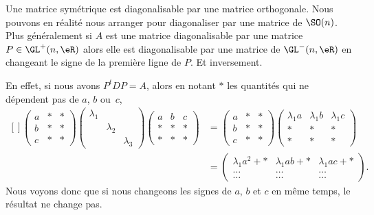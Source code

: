 \begin{remark}  \label{RemGKDZfxu}
    Une matrice symétrique est diagonalisable par une matrice orthogonale. Nous pouvons en réalité nous arranger pour diagonaliser par une matrice de \( \SO(n)\). Plus généralement si \( A\) est une matrice diagonalisable par une matrice \( P\in\GL^+(n,\eR)\) alors elle est diagonalisable par une matrice de \( \GL^-(n,\eR)\) en changeant le signe de la première ligne de \( P\). Et inversement.

    En effet, si nous avons \( P^tDP=A\), alors en notant \( *\) les quantités qui ne dépendent pas de \( a\), \( b\) ou~\( c\),
    \begin{equation}
        \begin{aligned}[]
        \begin{pmatrix}
            a    &   *    &   *    \\
            b    &   *    &   *    \\
            c    &   *    &   *
        \end{pmatrix}
        \begin{pmatrix}
            \lambda_1    &       &       \\
                &   \lambda_2    &       \\
                &       &   \lambda_3
            \end{pmatrix}
            \begin{pmatrix}
                a    &   b    &   c    \\
                *    &   *    &   *    \\
                *    &   *    &   *
            \end{pmatrix}&=
        \begin{pmatrix}
            a    &   *    &   *    \\
            b    &   *    &   *    \\
            c    &   *    &   *
        \end{pmatrix}
        \begin{pmatrix}
            \lambda_1a    &   \lambda_1b    &   \lambda_1c    \\
            *    &   *    &   *    \\
            *    &   *    &   *
        \end{pmatrix}\\
        &=\begin{pmatrix}
            \lambda_1 a^2+*   &   \lambda_1ab+*    &   \lambda_1ac  +*  \\
            \ldots    &   \ldots    &   \ldots    \\
            \ldots    &   \ldots    &   \ldots
        \end{pmatrix}.
        \end{aligned}
    \end{equation}
    Nous voyons donc que si nous changeons les signes de \( a\), \( b\) et \( c\) en même temps, le résultat ne change pas.
\end{remark}

